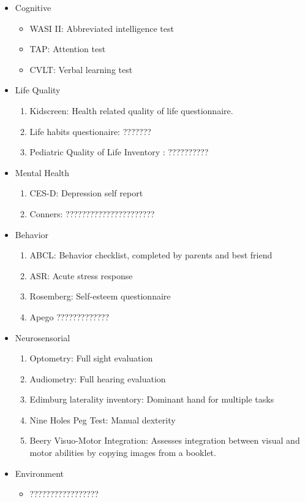 \begin{itemize}
	\item Cognitive
	\begin{itemize}
		\item WASI II: Abbreviated intelligence test
		\item TAP: Attention test
		\item CVLT: Verbal learning test
	\end{itemize}
	\item Life Quality
	\begin{enumerate}
		\item Kidscreen: Health related quality of life questionnaire.
		\item Life habits questionaire: ???????
		\item Pediatric Quality of Life Inventory : ??????????
	\end{enumerate}
	\item Mental Health
	\begin{enumerate}
		\item CES-D: Depression self report
		\item Conners: ??????????????????????		
	\end{enumerate}
	\item Behavior
	\begin{enumerate}
		\item ABCL: Behavior checklist, completed by parents and best friend
		\item ASR: Acute stress response
		\item Rosemberg: Self-esteem questionnaire
		\item Apego ?????????????
	\end{enumerate}
	\item Neurosensorial 
	\begin{enumerate}
		\item Optometry: Full sight evaluation
		\item Audiometry: Full hearing evaluation
		\item Edimburg laterality inventory: Dominant hand for multiple tasks
		\item Nine Holes Peg Test: Manual dexterity
		\item Beery Visuo-Motor Integration: Assesses integration between visual and motor abilities by copying images from a booklet.
	\end{enumerate}
	\item Environment
	\begin{itemize}
		\item ?????????????????

\end{itemize}
\end{itemize}

